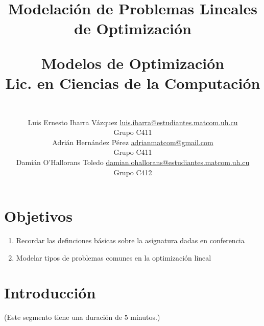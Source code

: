 \documentclass[a4paper,10pt,twocolumn]{article}
\title{Modelación de Problemas Lineales de Optimización\\
\vspace{2ex}
\begin{large}
Modelos de Optimización\\
Lic. en Ciencias de la Computación
\end{large}}
\author{\\
\name Luis Ernesto Ibarra Vázquez \email \href{mailto:luis.ibarra@estudiantes.matcom.uh.cu}{luis.ibarra@estudiantes.matcom.uh.cu}
	\\ \addr Grupo C411 \\
\name Adrián Hernández Pérez \email \href{mailto:adrianmatcom@gmail.com}{adrianmatcom@gmail.com}
	\\ \addr Grupo C411 \\
\name Damián O'Hallorans Toledo \email \href{mailto:damian.ohallorans@estudiantes.matcom.uh.cu}{damian.ohallorans@estudiantes.matcom.uh.cu}
	\\ \addr Grupo C412} %
\theoremstyle{theorem}
\theoremstyle{definition}
\theoremstyle{remark}
\begin{document}

\section{Objetivos}
\begin{enumerate}
	\item Recordar las definciones básicas sobre la asignatura dadas en conferencia
	\item Modelar tipos de problemas comunes en la optimización lineal
\end{enumerate}


\section{Introducción}\label{sec:intro}
(Este segmento tiene una duración de $5$ minutos.)\\
\end{document}
